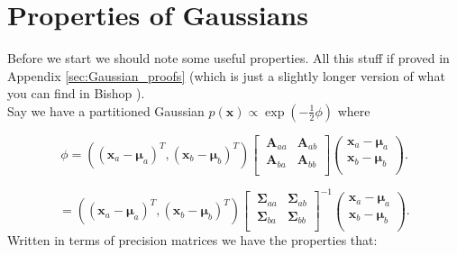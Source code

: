 \documentclass[a4paper, 11pt]{article}
\begin{document}



\newpage
\appendix

\section{Properties of Gaussians}\label{sec:properties_of_gaussians}
Before we start we should note some useful properties. All this stuff if proved in Appendix \ref{sec:Gaussian_proofs} (which is just a slightly longer version of what you can find in Bishop \cite{Bishop2013}). \\

Say we have a partitioned Gaussian $p(\boldsymbol{x}) \propto \exp(-\frac{1}{2}\phi)$ where

\begin{equation}
\phi = \left((\boldsymbol{x}_a-\boldsymbol{\mu}_a)^T, (\boldsymbol{x}_b-\boldsymbol{\mu}_b)^T \right)
\left[\
  \begin{array}{cc}
    \boldsymbol{A}_{aa} & \boldsymbol{A}_{ab} \\
    \boldsymbol{A}_{ba} & \boldsymbol{A}_{bb} \\
  \end{array}
\right]
\left(
  \begin{array}{c}
    \boldsymbol{x}_a-\boldsymbol{\mu}_a \\
    \boldsymbol{x}_b-\boldsymbol{\mu}_b \\
  \end{array}
\right).
\end{equation}

\begin{equation}
= \left((\boldsymbol{x}_a-\boldsymbol{\mu}_a)^T, (\boldsymbol{x}_b-\boldsymbol{\mu}_b)^T \right)
\left[\
  \begin{array}{cc}
    \boldsymbol{\Sigma}_{aa} & \boldsymbol{\Sigma}_{ab} \\
    \boldsymbol{\Sigma}_{ba} & \boldsymbol{\Sigma}_{bb} \\
  \end{array}
\right]^{-1}
\left(
  \begin{array}{c}
    \boldsymbol{x}_a-\boldsymbol{\mu}_a \\
    \boldsymbol{x}_b-\boldsymbol{\mu}_b \\
  \end{array}
\right).
\end{equation}
Written in terms of precision matrices we have the properties that:
\end{document}
